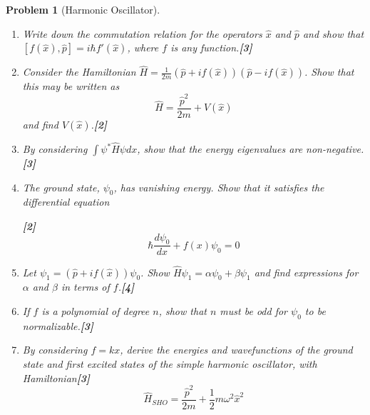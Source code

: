 \documentclass[a4paper]{article}
\theoremstyle{new}
\newtheorem{qns}{Problem}[subsection]
\begin{document}
\begin{qns}[Harmonic Oscillator]\leavevmode
\begin{enumerate}[label=(\roman*)]
\item Write down the commutation relation for the operators $\hat{x}$ and $\hat{p}$ and show that $[f(\hat{x}),\hat{p}]=i\hbar f'(\hat{x})$, where $f$ is any function.\hfill\textbf{[3]}
\item Consider the Hamiltonian $\hat{H}=\frac{1}{2m}(\hat{p}+if(\hat{x}))(\hat{p}-if(\hat{x}))$. Show that this may be written as
$$\hat{H}=\frac{\hat{p}^2}{2m}+V(\hat{x})$$
and find $V(\hat{x})$.\hfill\textbf{[2]}
\item By considering $\int\psi^*\hat{H}\psi dx$, show that the energy eigenvalues are non-negative.\hfill\textbf{[3]}
\item The ground state, $\psi_0$, has vanishing energy. Show that it satisfies the differential equation

\hfill\textbf{[2]}
$$\hbar\frac{d\psi_0}{dx}+f(x)\psi_0=0$$
\item Let $\psi_1=(\hat{p}+if(\hat{x}))\psi_0$. Show $\hat{H}\psi_1=\alpha\psi_0+\beta\psi_1$ and find expressions for $\alpha$ and $\beta$ in terms of $f$.\hfill\textbf{[4]}
\item If $f$ is a polynomial of degree $n$, show that $n$ must be odd for $\psi_0$ to be normalizable.\hfill\textbf{[3]}
\item By considering $f=kx$, derive the energies and wavefunctions of the ground state and first excited states of the simple harmonic oscillator, with Hamiltonian\hfill\textbf{[3]}
$$\hat{H}_{SHO}=\frac{\hat{p}^2}{2m}+\frac{1}{2}m\omega^2\hat{x}^2$$
\end{enumerate}
\end{qns}
\end{document}
